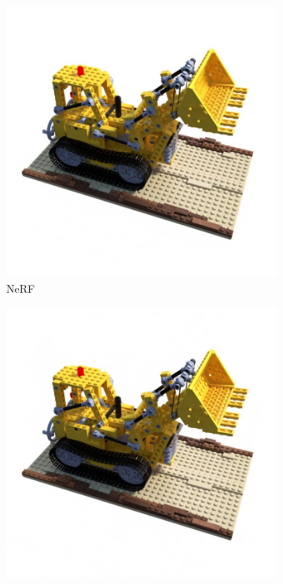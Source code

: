 \documentclass[12pt, a4paper, twoside]{book}
\numberwithin{equation}{chapter}
\numberwithin{theorem}{section}
\numberwithin{definition}{section}
\numberwithin{definitionChapter}{chapter}
\begin{document}
	\begin{figure}[H]
		\centering
		\begin{subfigure}{0.3\textwidth}
			\centering
			\includegraphics[scale=0.2]{img/nerf/nerf_lego_31.jpg}
			\caption{NeRF}
		\end{subfigure}
		\hspace*{\fill}
		\begin{subfigure}{0.3\textwidth}
			\centering
			\includegraphics[scale=0.2]{img/mipnerf/mipnerf_lego_31.jpg}

\end{subfigure}
\end{figure}
\end{document}
